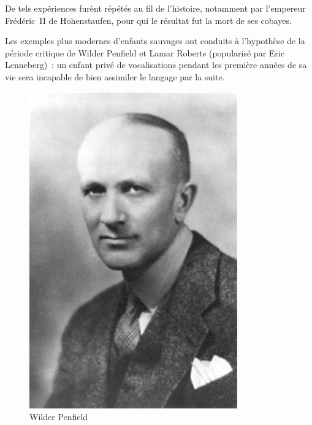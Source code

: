 \begin{minipage}[H]{0.7\linewidth}
De tels expériences furènt répétés au fil de l'histoire, notamment par l'empereur Frédéric~II de Hohenstaufen, pour qui le résultat fut la mort de ses \og{}cobayes\fg{}\cite{ggcoulton-francis-to-dante}. 

Les exemples plus modernes d'enfants \og{}sauvages\fg{} ont conduits à l'hypothèse de la \og{}période critique\fg{} de Wilder Penfield et Lamar Roberts\cite{penfield2003speech} (popularisé par Eric Lenneberg\cite{lenneberg-crit-period})~: un enfant privé de vocalisations pendant les première années de sa vie sera incapable de bien assimiler le langage par la suite.
\end{minipage}
\begin{minipage}[H]{0.3\linewidth}
  \begin{figure}[H]
  \centering
  \includegraphics[width=0.8\textwidth]{../resources/illustrations/penfield}
  \caption{Wilder Penfield}
  \end{figure}
\end{minipage}

